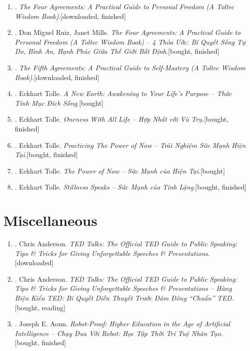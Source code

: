 \documentclass{article}
\begin{document}
\begin{enumerate}
	\item \cite{Ruiz2011}. \textit{The Four Agreements: A Practical Guide to Personal Freedom (A Toltec Wisdom Book)}.\hfill\textsf{[downloaded, finished]}
	\item \cite{Ruiz_Mills2022}. Don Miguel Ruiz, Janet Mills. \textit{The Four Agreements: A Practical Guide to Personal Freedom (A Toltec Wisdom Book) -- 4 Thỏa Ước: Bí Quyết Sống Tự Do, Bình An, Hạnh Phúc Giữa Thế Giới Bất Định}.\hfill\textsf{[bought, finished]}
	\item \cite{Ruiz_Ruiz2011}. \textit{The Fifth Agreements: A Practical Guide to Self-Mastery (A Toltec Wisdom Book)}.\hfill\textsf{[downloaded, finished]}
	\item \cite{Tolle2021d}. Eckhart Tolle. \textit{A New Earth: Awakening to Your Life's Purpose -- Thức Tỉnh Mục Đích Sống}.\hfill\textsf{[bought]}
	\item \cite{Tolle2021a}. Eckhart Tolle. \textit{Oneness With All Life -- Hợp Nhất với Vũ Trụ}.\hfill\textsf{[bought, finished]}
	\item \cite{Tolle2021b}. Eckhart Tolle. \textit{Practicing The Power of Now -- Trải Nghiệm Sức Mạnh Hiện Tại}.\hfill\textsf{[bought, finished]}
	\item \cite{Tolle2021c}. Eckhart Tolle. \textit{The Power of Now -- Sức Mạnh của Hiện Tại}.\hfill\textsf{[bought]}
	\item \cite{Tolle2022}. Eckhart Tolle. \textit{Stillness Speaks -- Sức Mạnh của Tĩnh Lặng}.\hfill\textsf{[bought, finished]}
\end{enumerate}


\section{Miscellaneous}

\begin{enumerate}
	\item \cite{Anderson2016}. Chris Anderson. \textit{TED Talks: The Official TED Guide to Public Speaking: Tips \& Tricks for Giving Unforgettable Speeches \& Presentations}.\hfill\textsf{[downloaded]}
	\item \cite{Anderson2022}. Chris Anderson. \textit{TED Talks: The Official TED Guide to Public Speaking: Tips \& Tricks for Giving Unforgettable Speeches \& Presentations -- Hùng Biện Kiểu TED: Bí Quyết Diễn Thuyết Trước Đám Đông ``Chuẩn'' TED}.\\\mbox{}\hfill\textsf{[bought, reading]}
	\item \cite{Aoun2019}. Joseph E. Aoun. \textit{Robot-Proof: Higher Education in the Age of Artificial Intelligence -- Chạy Đua Với Robot: Học Tập Thời Trí Tuệ Nhân Tạo}.\hfill\textsf{[bought, finished]}
\end{enumerate}


\printbibliography[heading=bibintoc]
	
\end{document}
